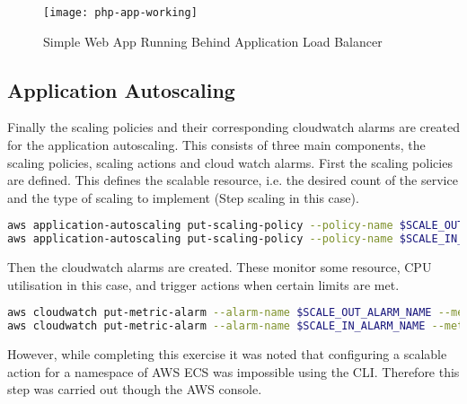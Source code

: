 \begin{figure}[H]
	\setlength{\belowcaptionskip}{15pt plus 3pt minus 2pt}
	\caption{Simple Web App Running Behind Application Load Balancer}
	\centering
	\texttt{[image: php-app-working]}
	\label{fig:app}
\end{figure}


\subsection{Application Autoscaling}
Finally the scaling policies and their corresponding cloudwatch alarms are created for the application autoscaling.
This consists of three main components, the scaling policies, scaling actions and cloud watch alarms.
First the scaling policies are defined. This defines the scalable resource, i.e. the desired count of the service and the type of scaling to implement (Step scaling in this case).
\begin{lstlisting}[language=bash]
aws application-autoscaling put-scaling-policy --policy-name $SCALE_OUT_POLICY_NAME  --service-namespace ecs --resource-id service/$CLUSTER_NAME/$SERVICE_NAME --scalable-dimension ecs:service:DesiredCount --policy-type StepScaling --step-scaling-policy-configuration="AdjustmentType=ChangeInCapacity,StepAdjustments=[{ScalingAdjustment=0,MetricIntervalLowerBound=0}],MetricAggregationType=Average,Cooldown=60"
aws application-autoscaling put-scaling-policy --policy-name $SCALE_IN_POLICY_NAME  --service-namespace ecs --resource-id service/$CLUSTER_NAME/$SERVICE_NAME --scalable-dimension ecs:service:DesiredCount --policy-type StepScaling --step-scaling-policy-configuration="AdjustmentType=ChangeInCapacity,StepAdjustments=[{ScalingAdjustment=0,MetricIntervalLowerBound=0}],MetricAggregationType=Average,Cooldown=60"
\end{lstlisting}
Then the cloudwatch alarms are created. These monitor some resource, CPU utilisation in this case, and trigger actions when certain limits are met. 
\begin{lstlisting}[language=bash]
aws cloudwatch put-metric-alarm --alarm-name $SCALE_OUT_ALARM_NAME --metric-name CPUUtilization --namespace AWS/ECS --statistic Average --dimensions "Name=ClusterName,Value=php-app Name=ServiceName,Value=php-app-service" --period 60 --evaluation-periods 60 --comparison-operator GreaterThanOrEqualToThreshold --threshold 75 --unit Percent --actions-enabled --alarm-actions $SCALE_OUT_POLICY_ARN
aws cloudwatch put-metric-alarm --alarm-name $SCALE_IN_ALARM_NAME --metric-name CPUUtilization --namespace AWS/ECS --statistic Average --dimensions "Name=ClusterName,Value=php-app Name=ServiceName,Value=php-app-service" --period 60 --evaluation-periods 60 --comparison-operator LessThanOrEqualToThreshold --threshold 25 --unit Percent --actions-enabled --alarm-actions $SCALE_IN_POLICY_ARN
\end{lstlisting}
However, while completing this exercise it was noted that configuring a scalable action for a namespace of AWS ECS was impossible using the CLI. Therefore this step was carried out though the AWS console.
